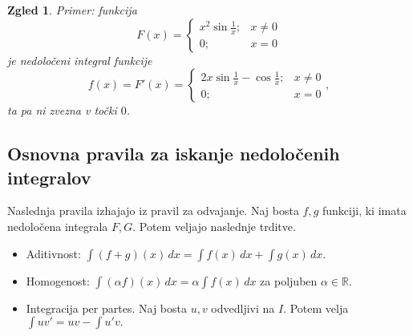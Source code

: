 \documentclass[10pt, a4paper]{article}
\newtheorem{zgled}{Zgled}[section]
\newcommand{\R}{\mathbb {R}}
\begin{document}
\begin{zgled}
    Primer: funkcija $$F(x) = \begin{cases}
        x^2 \sin \frac{1}{x} ;& x \neq 0\\
        0;& x = 0
    \end{cases}$$ je nedoločeni integral funkcije $$f(x) = F'(x) = \begin{cases}
        2x \sin \frac{1}{x} - \cos \frac{1}{x} ;& x \neq 0\\
        0;& x = 0
    \end{cases},$$ ta pa ni zvezna v točki $0$.
\end{zgled}
\begin{comment}
\subsection{Tabela osnovnih nedoločenih integralov}

\begin{table}[htb]
    \centering
    \begin{tabular}{cc}
        \toprule
        $f(x)$ & $\int f(x)\,dx$\\
        \midrule
        $x^n;\ n \neq -1$ & $\frac{1}{n+1} x^{n+1} + c$\\
        $\frac{1}{x}$ & $\ln |x| + c$\\
        $e^x$ & $e^x + c$\\
        $\sin x$ & $- \cos x + c$\\
        $\cos x$ & $\sin x + c$\\
        $\frac{1}{\cos^2 x}$ & $\tan x + c$\\
        $\frac{1}{\sin^2 x}$ & $- \cot x + c$\\
        $\frac{1}{1 + x^2}$ & $\arctan x + c$\\
        $\frac{1}{\sqrt{1-x^2}}$ & $\arcsin x + c$\\
        $\frac{1}{\sqrt{x^2 + a}}$ & $\ln (x + \sqrt{x^2 + a}) + c$\\
        \bottomrule
    \end{tabular}
\end{table}
\end{comment}
\subsection{Osnovna pravila za iskanje nedoločenih integralov}

Naslednja pravila izhajajo iz pravil za odvajanje.
Naj bosta $f,g$ funkciji, ki imata nedoločena integrala $F, G$.
Potem veljajo naslednje trditve.
\begin{itemize}
    \item Aditivnost: $\int (f+g)(x)\,dx = \int f(x)\,dx + \int g(x)\,dx$.
    \item Homogenost: $\int (\alpha f) (x)\,dx = \alpha \int f(x)\,dx$ za poljuben $\alpha \in \R$.
    \item Integracija per partes. Naj bosta $u,v$ odvedljivi na $I$. Potem velja
    $\int u v' = u v - \int u' v.$
\end{itemize}
\end{document}
